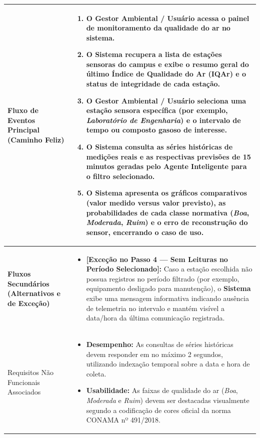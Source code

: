 \documentclass[11pt, a4paper]{article}
\begin{document}
\begin{longtable}{|>{\bfseries}p{3.8cm}|p{12.4cm}|}
Fluxo de Eventos Principal (Caminho Feliz) & 
\begin{enumerate}[nosep, leftmargin=0.5cm]
    \item O \textbf{Gestor Ambiental / Usuário} acessa o painel de monitoramento da qualidade do ar no sistema.
    \item O \textbf{Sistema} recupera a lista de estações sensoras do campus e exibe o resumo geral do último Índice de Qualidade do Ar (IQAr) e o status de integridade de cada estação.
    \item O \textbf{Gestor Ambiental / Usuário} seleciona uma estação sensora específica (por exemplo, \emph{Laboratório de Engenharia}) e o intervalo de tempo ou composto gasoso de interesse.
    \item O \textbf{Sistema} consulta as séries históricas de medições reais e as respectivas previsões de 15 minutos geradas pelo Agente Inteligente para o filtro selecionado.
    \item O \textbf{Sistema} apresenta os gráficos comparativos (valor medido versus valor previsto), as probabilidades de cada classe normativa (\emph{Boa}, \emph{Moderada}, \emph{Ruim}) e o erro de reconstrução do sensor, encerrando o caso de uso.
\end{enumerate} \\ \hline

Fluxos Secundários (Alternativos e de Exceção) & 
\begin{itemize}[nosep, leftmargin=0.5cm]
    \item \textbf{[Exceção no Passo 4 --- Sem Leituras no Período Selecionado]:} Caso a estação escolhida não possua registros no período filtrado (por exemplo, equipamento desligado para manutenção), o \textbf{Sistema} exibe uma mensagem informativa indicando ausência de telemetria no intervalo e mantém visível a data/hora da última comunicação registrada.
\end{itemize} \\ \hline

Requisitos Não Funcionais Associados & 
\begin{itemize}[nosep, leftmargin=0.5cm]
    \item \textbf{Desempenho:} As consultas de séries históricas devem responder em no máximo 2 segundos, utilizando indexação temporal sobre a data e hora de coleta.
    \item \textbf{Usabilidade:} As faixas de qualidade do ar (\emph{Boa}, \emph{Moderada} e \emph{Ruim}) devem ser destacadas visualmente segundo a codificação de cores oficial da norma CONAMA nº 491/2018.
\end{itemize} \\ \hline
\end{longtable}
\end{document}
